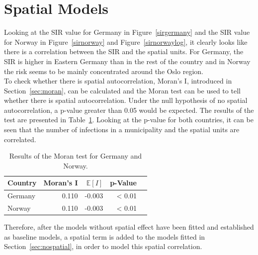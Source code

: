 \section{Spatial Models}\label{ch:spatial}
Looking at the SIR value for Germany in Figure~\ref{sirgermany} and the SIR value for Norway in Figure~\ref{sirnorway} and Figure~\ref{sirnorwaylog}, it clearly looks like there is a correlation between the SIR and the spatial units. For Germany, the SIR is higher in Eastern Germany than in the rest of the country and in Norway the risk seems to be mainly concentrated around the Oslo region. \\
To check whether there is spatial autocorrelation, Moran's I, introduced in Section~\ref{sec:moran}, can be calculated and the Moran test can be used to tell whether there is spatial autocorrelation. Under the null hypothesis of no spatial autocorrelation, a p-value greater than 0.05 would be expected. The results of the test are presented in Table~\ref{moranTest}. Looking at the p-value for both countries, it can be seen that the number of infections in a municipality and the spatial units are correlated.
\begin{table}[H] 
\caption{Results of the Moran test for Germany and Norway. \label{moranTest}}
\begin{tabular}{l r r r r}
\toprule
\textbf{Country} & \textbf{Moran's I}	& \textbf{$\mathbb{E}\left[I\right]$}	& \textbf{p-Value} \\
\midrule
Germany & 0.110 & -0.003 & < 0.01 \\
Norway & 0.110 & -0.003 & < 0.01 \\
\bottomrule
\end{tabular}
\end{table}
Therefore, after the models without spatial effect have been fitted and established as baseline models, a spatial term is added to the models fitted in Section~\ref{sec:nospatial}, in order to model this spatial correlation.
